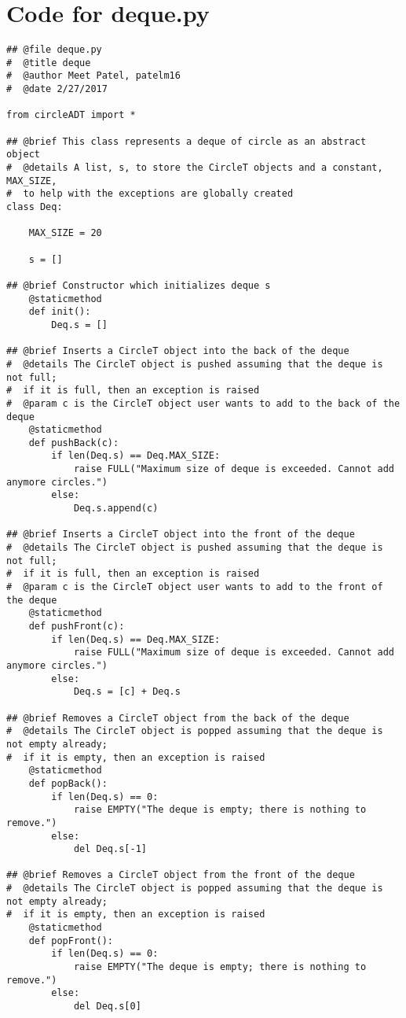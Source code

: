 \documentclass[12pt]{article}
\begin{document}
\section{Code for deque.py} \label{MyDequeSect}
\begin{lstlisting}
## @file deque.py
#  @title deque
#  @author Meet Patel, patelm16
#  @date 2/27/2017

from circleADT import *

## @brief This class represents a deque of circle as an abstract object
#  @details A list, s, to store the CircleT objects and a constant, MAX_SIZE,
#  to help with the exceptions are globally created
class Deq:

    MAX_SIZE = 20

    s = []
    
## @brief Constructor which initializes deque s
    @staticmethod
    def init():
        Deq.s = []

## @brief Inserts a CircleT object into the back of the deque
#  @details The CircleT object is pushed assuming that the deque is not full;
#  if it is full, then an exception is raised
#  @param c is the CircleT object user wants to add to the back of the deque
    @staticmethod
    def pushBack(c):
        if len(Deq.s) == Deq.MAX_SIZE:
            raise FULL("Maximum size of deque is exceeded. Cannot add anymore circles.")
        else:
            Deq.s.append(c)

## @brief Inserts a CircleT object into the front of the deque
#  @details The CircleT object is pushed assuming that the deque is not full;
#  if it is full, then an exception is raised
#  @param c is the CircleT object user wants to add to the front of the deque
    @staticmethod
    def pushFront(c):
        if len(Deq.s) == Deq.MAX_SIZE:
            raise FULL("Maximum size of deque is exceeded. Cannot add anymore circles.")
        else:
            Deq.s = [c] + Deq.s

## @brief Removes a CircleT object from the back of the deque
#  @details The CircleT object is popped assuming that the deque is not empty already;
#  if it is empty, then an exception is raised
    @staticmethod
    def popBack():
        if len(Deq.s) == 0:
            raise EMPTY("The deque is empty; there is nothing to remove.")
        else:
            del Deq.s[-1]

## @brief Removes a CircleT object from the front of the deque
#  @details The CircleT object is popped assuming that the deque is not empty already;
#  if it is empty, then an exception is raised
    @staticmethod
    def popFront():
        if len(Deq.s) == 0:
            raise EMPTY("The deque is empty; there is nothing to remove.")
        else:
            del Deq.s[0]
            

\end{lstlisting}
\end{document}
